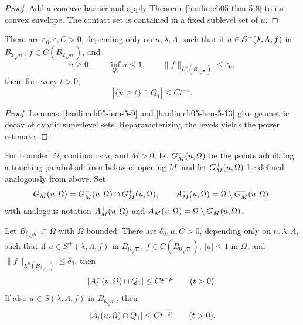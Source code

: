 \begin{proof}
\sketch Add a concave barrier and apply
Theorem~\ref{hanlin:ch05-thm-5-8} to its convex envelope. The contact set
is contained in a fixed sublevel set of $u$.
\end{proof}

\begin{lemma}\label{hanlin:ch05-lem-5-14}
There are $\varepsilon_0,\varepsilon,C>0$, depending only on
$n,\lambda,\Lambda$, such that if
$u\in\mathcal{S}^{+}(\lambda,\Lambda,f)$ in $B_{2\sqrt n}$,
$f\in C(B_{2\sqrt n})$, and
\[
u\geq0,\qquad \inf_{Q_3}u\leq1,\qquad
\|f\|_{L^n(B_{2\sqrt n})}\leq\varepsilon_0,
\]
then, for every $t>0$,
\[
|\{u\geq t\}\cap Q_1|\leq Ct^{-\varepsilon}.
\]
\end{lemma}

\begin{proof}
\sketch Lemmas~\ref{hanlin:ch05-lem-5-9} and
\ref{hanlin:ch05-lem-5-13} give geometric decay of dyadic superlevel sets.
Reparameterizing the levels yields the power estimate.
\end{proof}



For bounded $\Omega$, continuous $u$, and $M>0$, let
$G^-_{M}(u,\Omega)$ be the points admitting a touching paraboloid from
below of opening $M$, and let $G^+_{M}(u,\Omega)$ be defined analogously
from above. Set
\[
G_{M}(u,\Omega)=G^-_{M}(u,\Omega)\cap G^+_{M}(u,\Omega),
\qquad
A^-_{M}(u,\Omega)=\Omega\setminus G^-_{M}(u,\Omega),
\]
with analogous notation $A^+_{M}(u,\Omega)$ and
$A_{M}(u,\Omega)=\Omega\setminus G_{M}(u,\Omega)$.

\begin{lemma}\label{hanlin:ch05-lem-5-15}
Let $B_{6\sqrt n}\subset\Omega$ with $\Omega$ bounded. There are
$\delta_0,\mu,C>0$, depending only on $n,\lambda,\Lambda$, such that if
$u\in S^+(\lambda,\Lambda,f)$ in $B_{6\sqrt n}$,
$f\in C(B_{6\sqrt n})$, $|u|\leq1$ in $\Omega$, and
$\|f\|_{L^n(B_{6\sqrt n})}\leq\delta_0$, then
\[
|A^-_{t}(u,\Omega)\cap Q_1|\leq Ct^{-\mu}\qquad(t>0).
\]
If also $u\in S(\lambda,\Lambda,f)$ in $B_{6\sqrt n}$, then
\[
|A_{t}(u,\Omega)\cap Q_1|\leq Ct^{-\mu}\qquad(t>0).
\]
\end{lemma}

